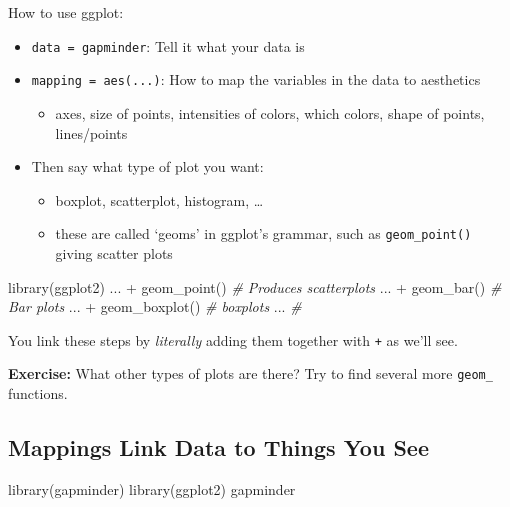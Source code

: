 \documentclass[
]{article}
\newenvironment{Shaded}{\begin{snugshade}}{\end{snugshade}}
\newcommand{\CommentTok}[1]{\textcolor[rgb]{0.56,0.35,0.01}{\textit{#1}}}
\newcommand{\FunctionTok}[1]{\textcolor[rgb]{0.00,0.00,0.00}{#1}}
\newcommand{\NormalTok}[1]{#1}
\newcommand{\SpecialCharTok}[1]{\textcolor[rgb]{0.00,0.00,0.00}{#1}}
\providecommand{\tightlist}{%
  \setlength{\itemsep}{0pt}\setlength{\parskip}{0pt}}
\begin{document}
How to use ggplot:

\begin{itemize}
\tightlist
\item
  \texttt{data\ =\ gapminder}: Tell it what your data is
\item
  \texttt{mapping\ =\ aes(...)}: How to map the variables in the data to
  aesthetics

  \begin{itemize}
  \tightlist
  \item
    axes, size of points, intensities of colors, which colors, shape of
    points, lines/points
  \end{itemize}
\item
  Then say what type of plot you want:

  \begin{itemize}
  \tightlist
  \item
    boxplot, scatterplot, histogram, \ldots{}
  \item
    these are called `geoms' in ggplot's grammar, such as
    \texttt{geom\_point()} giving scatter plots
  \end{itemize}
\end{itemize}

\begin{Shaded}
\begin{Highlighting}[]
\FunctionTok{library}\NormalTok{(ggplot2)}
\NormalTok{... }\SpecialCharTok{+} \FunctionTok{geom\_point}\NormalTok{() }\CommentTok{\# Produces scatterplots}
\NormalTok{... }\SpecialCharTok{+} \FunctionTok{geom\_bar}\NormalTok{() }\CommentTok{\# Bar plots}
\NormalTok{... }\SpecialCharTok{+} \FunctionTok{geom\_boxplot}\NormalTok{() }\CommentTok{\# boxplots}
\NormalTok{... }\CommentTok{\# }
\end{Highlighting}
\end{Shaded}

You link these steps by \emph{literally} adding them together with
\texttt{+} as we'll see.

\textbf{Exercise:} What other types of plots are there? Try to find
several more \texttt{geom\_} functions.

\hypertarget{mappings-link-data-to-things-you-see}{%
\subsection{Mappings Link Data to Things You
See}\label{mappings-link-data-to-things-you-see}}

\begin{Shaded}
\begin{Highlighting}[]
\FunctionTok{library}\NormalTok{(gapminder)}
\FunctionTok{library}\NormalTok{(ggplot2)}
\NormalTok{gapminder}
\end{Highlighting}
\end{Shaded}
\end{document}
